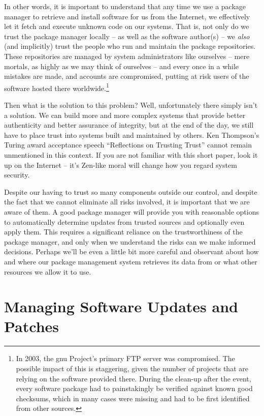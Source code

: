 In other words, it is important to understand that any
time we use a package manager to retrieve and install
software for us from the Internet, we effectively let
it fetch and execute unknown code on our systems.
That is, not only do we trust the package manager
locally -- as well as the software author(s) -- we {\em
also} (and implicitly) trust the people who run and
maintain the package repositories.  These repositories
are managed by system administrators like ourselves --
mere mortals, as highly as we may think of ourselves
-- and every once in a while mistakes are made, and
accounts are compromised, putting at risk users of the
software hosted there worldwide.\footnote{In 2003, the
\gls{gnu} Project's primary FTP server was
compromised.  The possible impact of this is
staggering, given the number of projects that are
relying on the software provided there.  During the
clean-up after the event, every software package had
to painstakingly be verified against known good
checksums, which in many cases were missing and had to
be first identified from other sources.}

Then what is the solution to this problem?  Well,
unfortunately there simply isn't a solution.  We can
build more and more complex systems that provide
better authenticity and better assurance of integrity,
but at the end of the day, we still have to place
trust into systems built and maintained by others.
Ken Thompson's  Turing award
acceptance speech ``Reflections on Trusting
Trust''\cite{thompson:trust} cannot remain unmentioned
in this context.  If you are not familiar with this
short paper, look it up on the Internet -- it's
Zen-like moral will change how you regard system
security.

Despite our having to trust so many components outside
our control, and despite the fact that we cannot
eliminate all risks involved, it is important that we
are aware of them.  A good package manager will
provide you with reasonable options to automatically
determine updates from trusted sources and optionally
even apply them.  This requires a significant reliance
on the trustworthiness of the package manager, and
only when we understand the risks can we make informed
decisions.  Perhaps we'll be even a little bit more
careful and observant about how and where our package
management system retrieves its data from or what
other resources we allow it to use.

\section{Managing Software Updates and Patches}
\label{software-installation:managing-updates}


